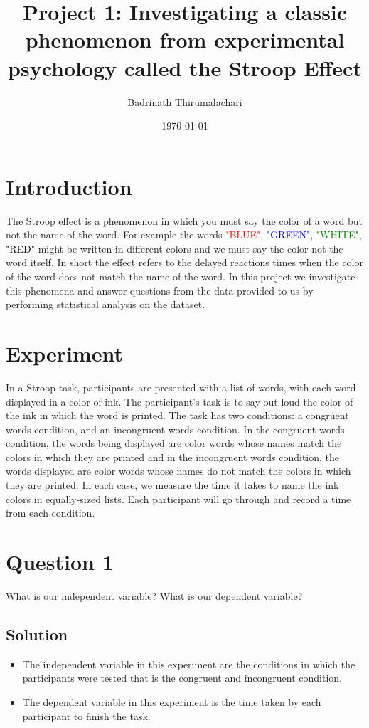 \documentclass[12pt]{article}%
\begin{document}
\title{Project 1: Investigating a classic phenomenon from experimental psychology called the Stroop Effect}
\author{Badrinath Thirumalachari}
\date{\today}
\maketitle 
 

\section*{Introduction}

The Stroop effect is a phenomenon in which you must say the color of a word but not the name of the word. For example the words \textcolor{red}{"BLUE"}, \textcolor{blue}{"GREEN"}, \textcolor{green}{"WHITE"}, \textcolor{black}{"RED"} might be written in different colors and we must say the color not the word itself. In short the effect refers to the delayed reactions times when the color of the word does not match the name of the word. In this project we investigate this phenomena and answer questions from the data provided to us by performing statistical analysis on the dataset.

\section*{Experiment}

In a Stroop task, participants are presented with a list of words, with each word displayed in a color of ink. The participant's task is to say out loud the color of the ink in which the word is printed. The task has two conditions: a congruent words condition, and an incongruent words condition. In the congruent words condition, the words being displayed are color words whose names match the colors in which they are printed and in the incongruent words condition, the words displayed are color words whose names do not match the colors in which they are printed. In each case, we measure the time it takes to name the ink colors in equally-sized lists. Each participant will go through and record a time from each condition.

\section*{Question 1}

What is our independent variable? What is our dependent variable?

\subsection*{Solution}
\begin{itemize}
  \item The independent variable in this experiment are the conditions in which the participants were tested that is the congruent and incongruent condition.

  \item The dependent variable in this experiment is the time taken by each participant to finish the task.
\end{itemize}
\newpage
\end{document}
